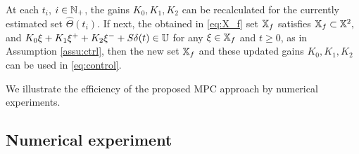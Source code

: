 \begin{remark}
	\begin{leftbar}[remarkbar]
	At each $t_{i}$, $i\in\mathbb{N}_{+}$, the gains $K_{0},K_{1},K_{2}$
	can be recalculated for the currently estimated set $\hat{\Theta}(t_{i})$.
	If next, the obtained in \eqref{eq:X_f} set $\mathbb{X}_{f}$ satisfies 
	$
	\mathbb{X}_{f}\subset\mathbb{X}^{2},
	$
	and
	$
	K_{0}\xi+K_{1}\xi^{+}+K_{2}\xi^{-}+S\delta(t)\in\mathbb{U}
	$
	for any $\xi\in\mathbb{X}_{f}$ and $t\geq0$, as in Assumption \ref{assu:ctrl},
	then the new set $\mathbb{X}_{f}$ and these updated gains $K_{0},K_{1},K_{2}$
	can be used in \eqref{eq:control}.
	\end{leftbar}
\end{remark}

We illustrate the efficiency of the proposed \gls{MPC} approach by numerical
experiments.

\subsection{Numerical experiment}

